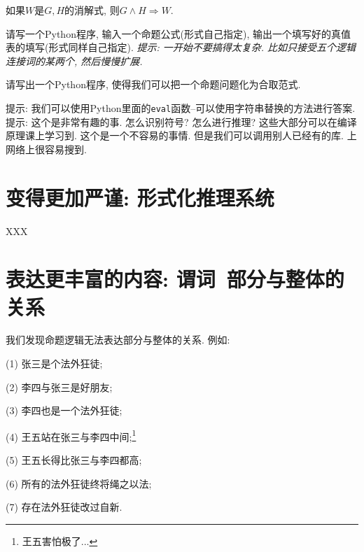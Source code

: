 \begin{theorem}
	如果$W$是$G,H$的消解式, 则$G\land H\Rightarrow W$. 
\end{theorem}

\begin{Exercise}\label{ex:proplogic2}

\Question 请写一个Python程序, 输入一个命题公式(形式自己指定), 输出一个填写好的真值表的填写(形式同样自己指定). \textit{提示: 一开始不要搞得太复杂. 比如只接受五个逻辑连接词的某两个, 然后慢慢扩展.} 

\Question 请写出一个Python程序, 使得我们可以把一个命题问题化为合取范式. 
\end{Exercise}

\begin{multicols}{2}

	\begin{Answer}[ref={ex:proplogic2}]
		\Question 提示: 我们可以使用Python里面的\texttt{eval}函数--可以使用字符串替换的方法进行答案. 
		\Question 提示: 这个是非常有趣的事. 怎么识别符号? 怎么进行推理? 这些大部分可以在编译原理课上学习到. 这个是一个不容易的事情. 但是我们可以调用别人已经有的库. 上网络上很容易搜到.  
	\end{Answer}
	
\end{multicols}

\section{变得更加严谨: 形式化推理系统}

XXX

\section{表达更丰富的内容: 谓词~部分与整体的关系}

我们发现命题逻辑无法表达部分与整体的关系. 例如: 

\begin{example}
	(1) 张三是个法外狂徒; 
	
	(2) 李四与张三是好朋友;
	
	(3) 李四也是一个法外狂徒;
	
	(4) 王五站在张三与李四中间;\footnote{王五害怕极了...} 
	
	(5) 王五长得比张三与李四都高;
	
	(6) 所有的法外狂徒终将绳之以法;
	
	(7) 存在法外狂徒改过自新. 
\end{example}


